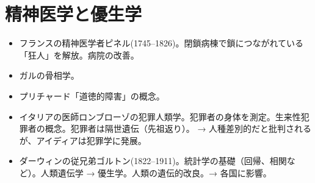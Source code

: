 \documentclass[dvipdfmx]{jsarticle}
\begin{document}
\section{精神医学と優生学}

\begin{itemize}
\item フランスの精神医学者ピネル(1745--1826)。閉鎖病棟で鎖につながれている「狂人」を解放。病院の改善。
\item ガルの骨相学。
\item プリチャード「道徳的障害」の概念。
\item イタリアの医師ロンブローゾの犯罪人類学。犯罪者の身体を測定。生来性犯罪者の概念。犯罪者は隔世遺伝（先祖返り）。 → 人種差別的だと批判されるが、アイディアは犯罪学に発展。
\item ダーウィンの従兄弟ゴルトン(1822--1911)。統計学の基礎（回帰、相関など）。人類遺伝学 → 優生学。人類の遺伝的改良。→ 各国に影響。

\end{itemize}


%   
% 
\end{document}
